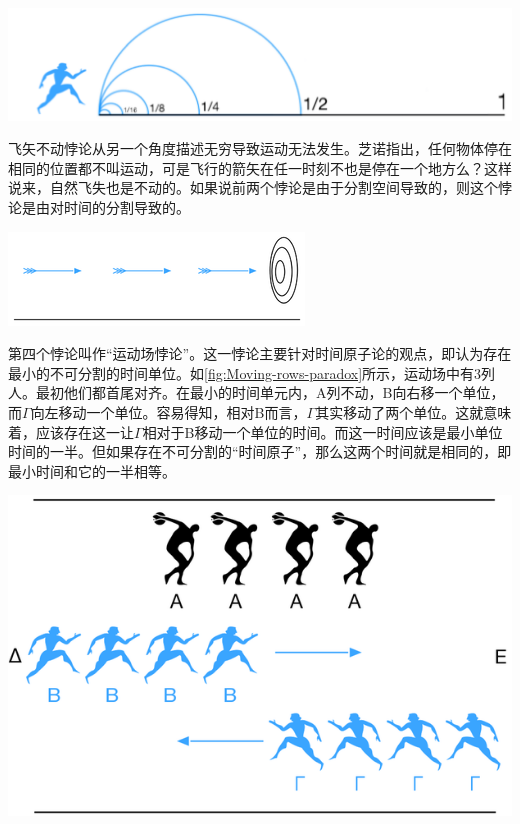 \documentclass[b5paper]{ctexart}
\begin{document}
\begin{mdframed}
\begin{center}
 \includegraphics[scale=0.4]{img/dichotomy-paradox}
 \label{fig:dichotomy-paradox}
\end{center}

飞矢不动悖论从另一个角度描述无穷导致运动无法发生。芝诺指出，任何物体停在相同的位置都不叫运动，可是飞行的箭矢在任一时刻不也是停在一个地方么？这样说来，自然飞失也是不动的。如果说前两个悖论是由于分割空间导致的，则这个悖论是由对时间的分割导致的。

\begin{center}
 \includegraphics[scale=0.4]{img/arrow-paradox}
 \label{fig:Arrow-paradox}
\end{center}

第四个悖论叫作“运动场悖论”。这一悖论主要针对时间原子论的观点，即认为存在最小的不可分割的时间单位。如\cref{fig:Moving-rows-paradox}所示，运动场中有3列人。最初他们都首尾对齐。在最小的时间单元内，A列不动，B向右移一个单位，而$\Gamma$向左移动一个单位。容易得知，相对B而言，$\Gamma$其实移动了两个单位。这就意味着，应该存在这一让$\Gamma$相对于B移动一个单位的时间。而这一时间应该是最小单位时间的一半。但如果存在不可分割的“时间原子”，那么这两个时间就是相同的，即最小时间和它的一半相等。

\begin{center}
 \includegraphics[scale=0.3]{img/moving-rows-paradox}
 \label{fig:Moving-rows-paradox}
\end{center}


\end{mdframed}
\end{document}
